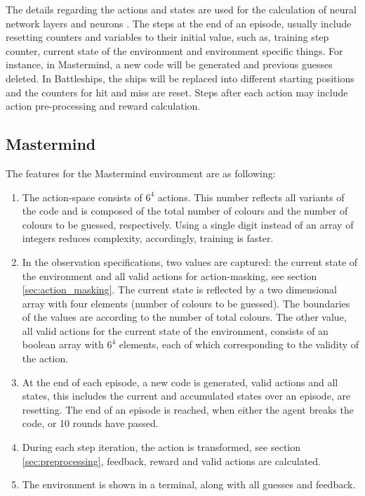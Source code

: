 The details regarding the actions and states are used for the calculation of neural network layers and neurons . The steps at the end of an episode, usually include resetting counters and variables to their initial value, such as, training step counter, current state of the environment and environment specific things. For instance, in Mastermind, a new code will be generated and previous guesses deleted. In Battleships, the ships will be replaced into different starting positions and the counters for hit and miss are reset. Steps after each action may include action pre-processing and reward calculation.

\subsection{Mastermind}
\label{ssec:mastermind}

The features for the Mastermind environment are as following:
\begin{enumerate}

	\item{The action-space consists of $6^4$ actions. This number reflects all variants of the code and is composed of the total number of colours and the number of colours to be guessed, respectively. Using a single digit instead of an array of integers reduces complexity, accordingly, training is faster.}
	\item{In the observation specifications, two values are captured: the current state of the environment and all valid actions for action-masking, see section \ref{sec:action_masking}. The current state is reflected by a two dimensional array with four elements (number of colours to be guessed). The boundaries of the values are according to the number of total colours. The other value, all valid actions for the current state of the environment, consists of an boolean array with $6^4$ elements, each of which corresponding to the validity of the action.}
	\item{At the end of each episode, a new code is generated, valid actions and all states, this includes the current and accumulated states over an episode, are resetting. The end of an episode is reached, when either the agent breaks the code, or 10 rounds have passed.}
	\item{During each step iteration, the action is transformed, see section \ref{sec:preprocessing}, feedback, reward and valid actions are calculated.}
	\item{The environment is shown in a terminal, along with all guesses and feedback.}

\end{enumerate}


